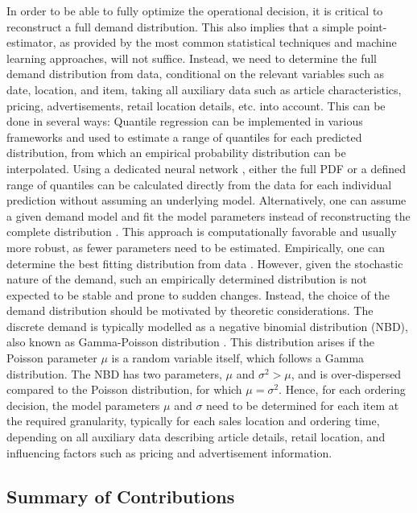 \documentclass[BCOR=1mm, DIV=calc,10pt,
twoside=true,
twocolumn,
headings=normal]{scrartcl}
\begin{document}
In order to be able to fully optimize the operational decision, it is critical to reconstruct a full demand distribution. This also implies that a simple point-estimator, as provided by the most common statistical techniques and machine learning approaches, will not suffice. Instead, we need to determine the full demand distribution from data, conditional on the relevant variables such as date, location, and item, taking all auxiliary data such as article characteristics, pricing, advertisements, retail location details, etc. into account. This can be done in several ways: Quantile regression \cite{koenker2001, wen2017} can be implemented in various frameworks and used to estimate a range of quantiles for each predicted distribution, from which an empirical probability distribution can be interpolated. Using a dedicated neural network \cite{Feindt2006190}, either the full PDF or a defined range of quantiles can be calculated directly from the data for each individual prediction without assuming an underlying model. Alternatively, one can assume a given demand model and fit the model parameters instead of reconstructing the complete distribution \cite{astonpr373, SALINAS20201181}. This approach is computationally favorable and usually more robust, as fewer parameters need to be estimated. Empirically, one can determine the best fitting distribution from data \cite{adan1995}. However, given the stochastic nature of the demand, such an empirically determined distribution is not expected to be stable and prone to sudden changes. Instead, the choice of the demand distribution should be motivated by theoretic considerations. The discrete demand is typically modelled as a negative binomial distribution (NBD), also known as Gamma-Poisson distribution \cite{Ehrenberg1959,Ehrenberg1967,Ehrenberg1972,Chatfield1973,Schmittlein_1985}. This distribution arises if the Poisson parameter $\mu$ is a random variable itself, which follows a Gamma distribution. The NBD has two parameters, $\mu$ and $ \sigma^2 > \mu$, and is over-dispersed compared to the Poisson distribution, for which $\mu = \sigma^2$. Hence, for each ordering decision, the model parameters $\mu$ and $\sigma$ need to be determined for each item at the required granularity, typically for each sales location and ordering time, depending on all auxiliary data describing article details, retail location, and influencing factors such as pricing and advertisement information.

\subsection*{Summary of Contributions}
\end{document}
